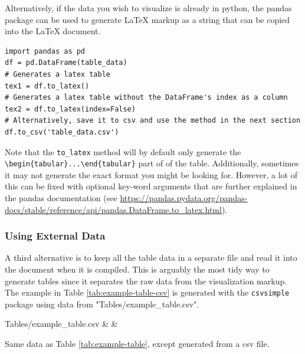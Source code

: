 Alternatively, if the data you wish to visualize is already in python, the pandas package can be used to generate LaTeX markup as a string that can be copied into the LaTeX document.

\begin{verbatim}
import pandas as pd 
df = pd.DataFrame(table_data)
# Generates a latex table
tex1 = df.to_latex()
# Generates a latex table without the DataFrame's index as a column
tex2 = df.to_latex(index=False)
# Alternatively, save it to csv and use the method in the next section
df.to_csv('table_data.csv')
\end{verbatim}

Note that the \verb|to_latex| method will by default only generate the \verb|\begin{tabular}...\end{tabular}| part of of the table. Additionally, sometimes it may not generate the exact format you might be looking for. However, a lot of this can be fixed with optional key-word arguments that are further explained in the pandas documentation (see  \url{https://pandas.pydata.org/pandas-docs/stable/reference/api/pandas.DataFrame.to_latex.html}).


\subsubsection{Using External Data}
\label{app:example-table-external}

A third alternative is to keep all the table data in a separate file and read it into the document when it is compiled.
This is arguably the most tidy way to generate tables since it separates the raw data from the visualization markup.
The example in Table \ref{tab:example-table-csv} is generated with the \verb|csvsimple| package using data from "Tables/example\_table.csv".

\begin{table}[H]
    \centering
    \csvreader[
        tabular=l|cc,
        table head=\toprule Statistics & Agent57 & R2D2 (bandit) \\\midrule,
        table foot=\bottomrule,
        head to column names,
    ]
    {Tables/example_table.csv}{}
    {\statistics & \csvcolii & \csvcoliii}
    \caption{Same data as Table \ref{tab:example-table}, except generated from a csv file.}
    \label{tab:example-table-csv}
\end{table}





